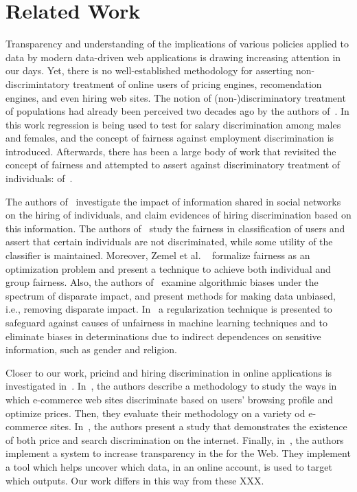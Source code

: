 \section{Related Work}
\label{sect:related}
Transparency and understanding of the implications of various policies applied
to data by modern data-driven web applications is drawing increasing attention
in our days. Yet, there is no well-established methodology for asserting
non-discrimintatory treatment of online users of pricing engines,
recomendation engines, and even hiring web sites. The notion of
(non-)discriminatory treatment of populations had already been perceived two decades
ago by the authors of~\cite{EmploymentDisc}. In this work regression is being
used to test for salary discrimination among males and females, and the concept
of fairness against employment discrimination is introduced. Afterwards,
there has been a large body of work that revisited the concept of fairness and
attempted to assert against discriminatory treatment of individuals:
of~\cite{HiringDiscrimination,FairnessAwareness,FairnessRegularization,
FairRepresentation,DisparateImpact}.

The authors of~\cite{HiringDiscrimination} investigate the impact of
information shared in social networks on the hiring of individuals, and claim
evidences of hiring discrimination based on this information. The authors
of~\cite{FairnessAwareness} study the fairness in classification of users and
assert that certain individuals are not discriminated, while some utility
of the classifier is maintained. Moreover, Zemel et al.
~\cite{FairRepresentation} formalize fairness as an optimization problem and
present a technique to achieve both individual and group fairness. Also, the
authors of~\cite{DisparateImpact} examine algorithmic biases under the spectrum
of disparate impact, and present methods for making data unbiased, i.e.,
removing disparate impact. In~\cite{FairnessRegularization} a regularization
technique is presented to safeguard against causes of unfairness in machine
learning techniques and to eliminate biases in determinations due to indirect
dependences on sensitive information, such as gender and religion.

Closer to our work, pricind and hiring discrimination in online applications is
investigated in~\cite{PriceDiscrimination,SearchDiscrimination,XRay}.
In~\cite{PriceDiscrimination}, the authors describe a methodology to study the
ways in which e-commerce web sites discriminate based on users' browsing
profile and optimize prices. Then, they evaluate their methodology on a variety
od e-commerce sites.  In~\cite{SearchDiscrimination},  the authors present a
study that demonstrates the existence of both price and search discrimination
on the internet. Finally, in~\cite{HiringDiscrimination}, the authors implement
a system to increase transparency in the for the Web. They implement a tool
which helps uncover which data, in an online account,  is used to target 
which outputs. Our work differs in this way from these XXX.
